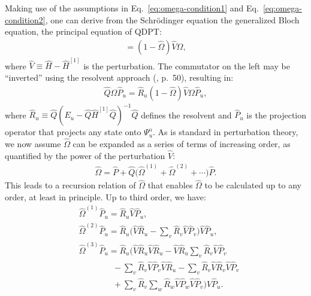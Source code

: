 Making use of the assumptions in Eq.~\eqref{eq:omega-condition1} and
Eq.~\eqref{eq:omega-condition2}, one can derive from the Schr\"odinger
equation the generalized Bloch equation, the principal equation of
QDPT:
\begin{gather*}
  [\hat \Omega, \hat{H}^{[1]}] =
  (1 - \hat \Omega) \hat V \Omega,
\end{gather*}
where $\hat V \equiv \hat H - \hat{H}^{[1]}$ is the perturbation.  The
commutator on the left may be ``inverted'' using the resolvent approach
(\cite{shavitt2009many}, p.\ 50), resulting in:
\begin{align*}
  \hat Q \Omega \hat P_u =
  \hat R_u (1 - \hat \Omega) \hat V \Omega \hat P_u,
\end{align*}
where $\hat R_u \equiv \hat Q (E_u - \hat Q \hat{H}^{[1]} \hat
Q)^{-1} \hat Q$ defines the resolvent and $\hat P_u$ is the projection
operator that projects any state onto $\Psi^{\mathrm{o}}_u$.  As is
standard in perturbation theory, we now assume $\hat \Omega$ can be
expanded as a series of terms of increasing order, as quantified by
the power of the perturbation $\hat V$:
\begin{align*}
  \hat \Omega = \hat P +
  \hat Q\bigl(\hat \Omega^{(1)} + \hat \Omega^{(2)} + \cdots\bigr) \hat P.
\end{align*}
This leads to a recursion relation of $\hat \Omega$ that enables
$\hat \Omega$ to be calculated up to any order, at least in principle.
Up to third order, we have:
\begin{align*}
  &\hat \Omega^{(1)} \hat P_u = \hat R_u \hat V \hat P_u, \\
  &\hat \Omega^{(2)} \hat P_u =
    \hat R_u \biggl(
    \hat V \hat R_u
    - \sum_v \hat R_v \hat V \hat P_v
    \biggr) \hat V \hat P_u, \\
  &\hat \Omega^{(3)} \hat P_u =
    \hat R_u \biggl(
    \hat V \hat R_u \hat V \hat R_u
    - \hat V \hat R_u \sum_v \hat R_v \hat V \hat P_v \\
  &\qquad\qquad
    - \sum_v \hat R_v \hat V \hat P_v \hat V \hat R_u
    - \sum_v \hat R_v \hat V \hat R_v \hat V \hat P_v \\
  &\qquad\qquad
    + \sum_v \hat R_v \sum_w \hat R_w \hat V \hat P_w \hat V \hat P_v
    \biggr) \hat V \hat P_u.
\end{align*}

